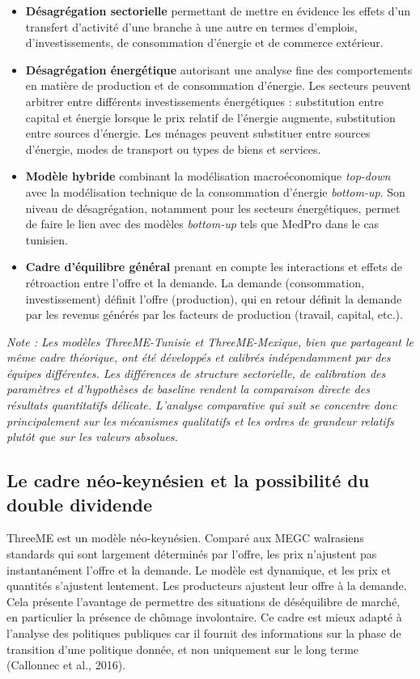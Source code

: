 \documentclass[12pt, a4paper]{article}
\begin{document}
\begin{itemize}
    \item \textbf{Désagrégation sectorielle} permettant de mettre en évidence les effets d'un transfert d'activité d'une branche à une autre en termes d'emplois, d'investissements, de consommation d'énergie et de commerce extérieur.
    \item \textbf{Désagrégation énergétique} autorisant une analyse fine des comportements en matière de production et de consommation d'énergie. Les secteurs peuvent arbitrer entre différents investissements énergétiques : substitution entre capital et énergie lorsque le prix relatif de l'énergie augmente, substitution entre sources d'énergie. Les ménages peuvent substituer entre sources d'énergie, modes de transport ou types de biens et services.
    \item \textbf{Modèle hybride} combinant la modélisation macroéconomique \textit{top-down} avec la modélisation technique de la consommation d'énergie \textit{bottom-up}. Son niveau de désagrégation, notamment pour les secteurs énergétiques, permet de faire le lien avec des modèles \textit{bottom-up} tels que MedPro dans le cas tunisien.
    \item \textbf{Cadre d'équilibre général} prenant en compte les interactions et effets de rétroaction entre l'offre et la demande. La demande (consommation, investissement) définit l'offre (production), qui en retour définit la demande par les revenus générés par les facteurs de production (travail, capital, etc.).
\end{itemize}

\textit{Note : Les modèles ThreeME-Tunisie et ThreeME-Mexique, bien que partageant le même cadre théorique, ont été développés et calibrés indépendamment par des équipes différentes. Les différences de structure sectorielle, de calibration des paramètres et d'hypothèses de baseline rendent la comparaison directe des résultats quantitatifs délicate. L'analyse comparative qui suit se concentre donc principalement sur les mécanismes qualitatifs et les ordres de grandeur relatifs plutôt que sur les valeurs absolues.}

\subsection{Le cadre néo-keynésien et la possibilité du double dividende}
\label{subsec:neokeynesien}

ThreeME est un modèle néo-keynésien. Comparé aux MEGC walrasiens standards qui sont largement déterminés par l'offre, les prix n'ajustent pas instantanément l'offre et la demande. Le modèle est dynamique, et les prix et quantités s'ajustent lentement. Les producteurs ajustent leur offre à la demande. Cela présente l'avantage de permettre des situations de déséquilibre de marché, en particulier la présence de chômage involontaire. Ce cadre est mieux adapté à l'analyse des politiques publiques car il fournit des informations sur la phase de transition d'une politique donnée, et non uniquement sur le long terme (Callonnec et al., 2016).
\end{document}
